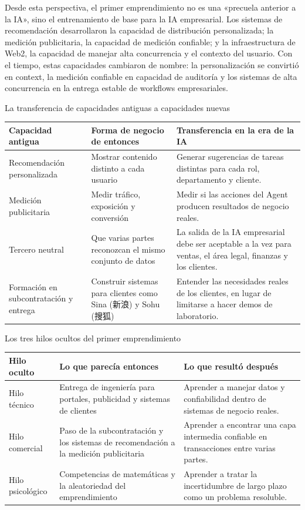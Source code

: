 Desde esta perspectiva, el primer emprendimiento no es una «precuela anterior a la IA», sino el entrenamiento de base para la IA empresarial. Los sistemas de recomendación desarrollaron la capacidad de distribución personalizada; la medición publicitaria, la capacidad de medición confiable; y la infraestructura de Web2, la capacidad de manejar alta concurrencia y el contexto del usuario. Con el tiempo, estas capacidades cambiaron de nombre: la personalización se convirtió en context, la medición confiable en capacidad de auditoría y los sistemas de alta concurrencia en la entrega estable de workflows empresariales.

\begin{knowledgebox}{La transferencia de capacidades antiguas a capacidades nuevas}
\begin{tabularx}{\textwidth}{p{}p{}X}
\toprule
Capacidad antigua & Forma de negocio de entonces & Transferencia en la era de la IA \\
\midrule
Recomendación personalizada & Mostrar contenido distinto a cada usuario & Generar sugerencias de tareas distintas para cada rol, departamento y cliente. \\
Medición publicitaria & Medir tráfico, exposición y conversión & Medir si las acciones del Agent producen resultados de negocio reales. \\
Tercero neutral & Que varias partes reconozcan el mismo conjunto de datos & La salida de la IA empresarial debe ser aceptable a la vez para ventas, el área legal, finanzas y los clientes. \\
Formación en subcontratación y entrega & Construir sistemas para clientes como Sina (新浪) y Sohu (搜狐) & Entender las necesidades reales de los clientes, en lugar de limitarse a hacer demos de laboratorio. \\
\bottomrule
\end{tabularx}
\end{knowledgebox}

\begin{knowledgebox}{Los tres hilos ocultos del primer emprendimiento}
\begin{tabularx}{\textwidth}{p{}p{}X}
\toprule
Hilo oculto & Lo que parecía entonces & Lo que resultó después \\
\midrule
Hilo técnico & Entrega de ingeniería para portales, publicidad y sistemas de clientes & Aprender a manejar datos y confiabilidad dentro de sistemas de negocio reales. \\
Hilo comercial & Paso de la subcontratación y los sistemas de recomendación a la medición publicitaria & Aprender a encontrar una capa intermedia confiable en transacciones entre varias partes. \\
Hilo psicológico & Competencias de matemáticas y la aleatoriedad del emprendimiento & Aprender a tratar la incertidumbre de largo plazo como un problema resoluble. \\
\bottomrule
\end{tabularx}
\end{knowledgebox}

